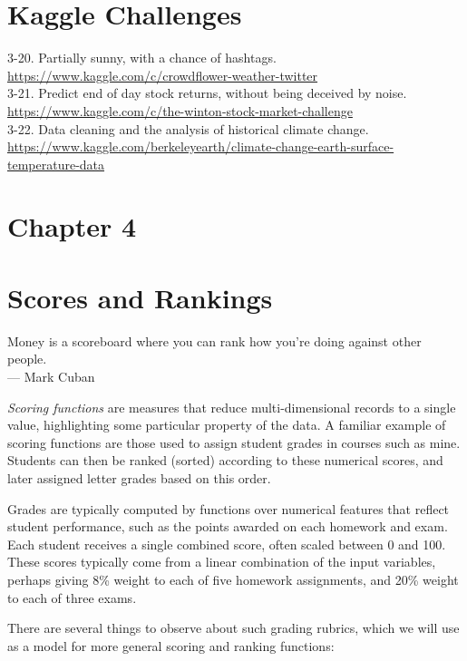 \documentclass[10pt]{article}
\begin{document}
\section*{Kaggle Challenges}
3-20. Partially sunny, with a chance of hashtags. \url{https://www.kaggle.com/c/crowdflower-weather-twitter}\\
3-21. Predict end of day stock returns, without being deceived by noise. \url{https://www.kaggle.com/c/the-winton-stock-market-challenge}\\
3-22. Data cleaning and the analysis of historical climate change. \url{https://www.kaggle.com/berkeleyearth/climate-change-earth-surface-temperature-data}

\section*{Chapter 4}
\section*{Scores and Rankings}
\begin{flushright}
Money is a scoreboard where you can rank how you're doing against other people. 
\\ — Mark Cuban
\end{flushright}

\textit{Scoring functions} are measures that reduce multi-dimensional records to a single value, highlighting some particular property of the data. A familiar example of scoring functions are those used to assign student grades in courses such as mine. Students can then be ranked (sorted) according to these numerical scores, and later assigned letter grades based on this order.

Grades are typically computed by functions over numerical features that reflect student performance, such as the points awarded on each homework and exam. Each student receives a single combined score, often scaled between 0 and 100. These scores typically come from a linear combination of the input variables, perhaps giving 8\% weight to each of five homework assignments, and 20\% weight to each of three exams.

There are several things to observe about such grading rubrics, which we will use as a model for more general scoring and ranking functions:
\end{document}
